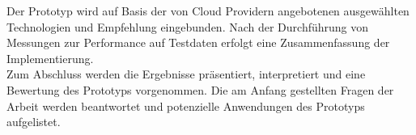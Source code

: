 Der Prototyp wird auf Basis der von Cloud Providern angebotenen ausgewählten Technologien und Empfehlung eingebunden. Nach der Durchführung von Messungen zur Performance auf Testdaten erfolgt eine Zusammenfassung der Implementierung.\\

Zum Abschluss werden die Ergebnisse präsentiert, interpretiert und eine Bewertung des Prototyps vorgenommen.  Die am Anfang gestellten Fragen der Arbeit werden beantwortet und potenzielle Anwendungen des Prototyps aufgelistet.

 